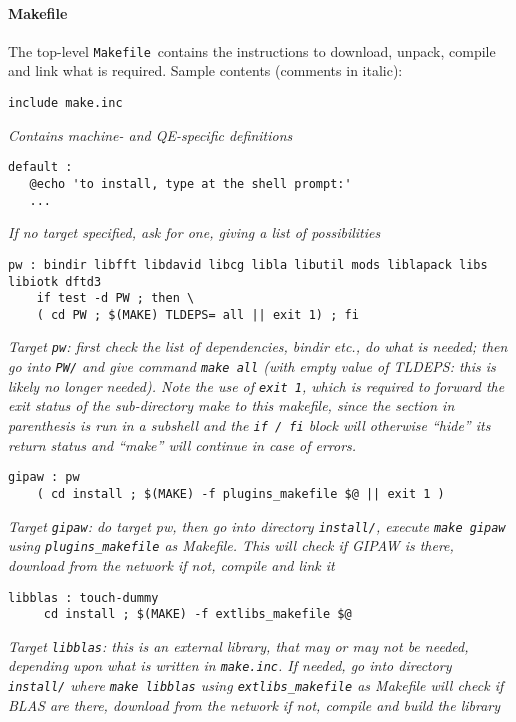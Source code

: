 \documentclass[12pt,a4paper]{article}
\def\qe{QE}
\def\Makefile{\texttt{Makefile}}
\begin{document}
\paragraph{Makefile}
The top-level \Makefile\ contains the instructions to download,
unpack, compile and link what is required. Sample contents
(comments in italic):
\begin{verbatim}
include make.inc
\end{verbatim}
{\em Contains machine- and \qe-specific definitions}
\begin{verbatim}
default :
   @echo 'to install, type at the shell prompt:'
   ...
\end{verbatim}
{\em If no target specified, ask for one, giving a list of possibilities}
\begin{verbatim}
pw : bindir libfft libdavid libcg libla libutil mods liblapack libs libiotk dftd3
    if test -d PW ; then \
    ( cd PW ; $(MAKE) TLDEPS= all || exit 1) ; fi

\end{verbatim}
{\em Target {\tt pw}: first check the list of dependencies, bindir etc.,
  do what is needed; then go into {\tt PW/} and give command
  {\tt make all} (with empty value of TLDEPS: this is likely no longer needed).
  Note the use of {\tt exit 1}, which is required to forward
the exit status of the sub-directory make to this makefile, since the section
in parenthesis is run in a subshell and the {\tt if / fi} block will otherwise
``hide'' its return status and ``make'' will continue in case of errors. }
\begin{verbatim}
gipaw : pw
	( cd install ; $(MAKE) -f plugins_makefile $@ || exit 1 )
\end{verbatim}
{\em Target {\tt gipaw}: do target pw, then go into directory
{\tt install/}, execute {\tt make gipaw} using {\tt plugins\_makefile}
as Makefile. This will check if GIPAW is there, download from the network
if not, compile and link it}
\begin{verbatim}
libblas : touch-dummy
     cd install ; $(MAKE) -f extlibs_makefile $@
\end{verbatim}
{\em Target {\tt libblas}: this is an external library, that may or may
not be needed, depending upon what is written in {\tt make.inc}. If
needed, go into directory {\tt install/} where {\tt make libblas} using
{\tt extlibs\_makefile} as Makefile will check if BLAS are there, download
from the network if not,
compile and build the library}
\end{document}
